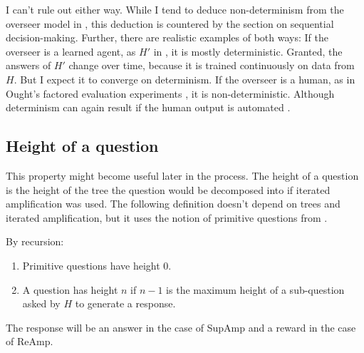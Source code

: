 \documentclass{farlamp}
\begin{document}
I can't rule out either way. While I tend to deduce non-determinism from the
overseer model in \textcite{ChriRelAmp}, this deduction is countered by the
section on sequential decision-making. Further, there are realistic examples of
both ways: If the overseer is a learned agent, as $H'$ in \textcite{CSASupAmp},
it is mostly deterministic. Granted, the answers of $H'$ change over time,
because it is trained continuously on data from $H$. But I expect it to converge
on determinism. If the overseer is a human, as in Ought's factored evaluation
experiments \parencite{StuhDelCog}, it is non-deterministic. Although
determinism can again result if the human output is automated
\parencite[see][sec. ‘Caching’ f.]{StuhTaxCapAmp}.

%
%
%
%


\subsection{Height of a question}

This property might become useful later in the process. The height of a
question is the height of the tree the question would be decomposed into if
iterated amplification was used. The following definition doesn't depend on
trees and iterated amplification, but it uses the notion of primitive questions
from \textcite[app. C]{CSASupAmp}.

\begin{definition} By recursion:
    \begin{enumerate}
    \item Primitive questions have height 0.
    \item A question has height $n$ if $n-1$ is the maximum height of a
        sub-question asked by $H$ to generate a response.
    \end{enumerate}
The response will be an answer in the case of SupAmp and a reward in the case of
ReAmp.
\end{definition}
\end{document}
